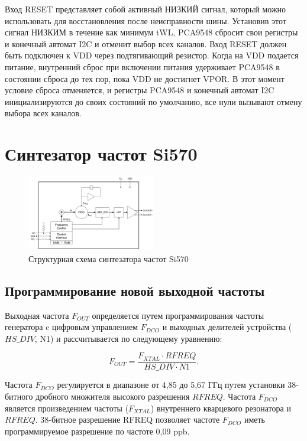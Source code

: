 \documentclass[a4paper,oneside ,14pt]{extreport}
\begin{document}
Вход RESET представляет собой активный НИЗКИЙ сигнал, который можно использовать для восстановления после неисправности шины. Установив этот сигнал НИЗКИМ в течение как минимум tWL, PCA9548 сбросит свои регистры и конечный автомат I2C и отменит выбор всех каналов. Вход RESET должен быть подключен к VDD через подтягивающий резистор.
Когда на VDD подается питание, внутренний сброс при включении питания удерживает PCA9548 в состоянии сброса до тех пор, пока VDD не достигнет VPOR. В этот момент условие сброса отменяется, и регистры PCA9548 и конечный автомат I2C инициализируются до своих состояний по умолчанию, все нули вызывают отмену выбора всех каналов.

\section{Синтезатор частот Si570}

\begin{figure}[h]
	\centering
	\includegraphics[width=0.5\textwidth]{image/Si570.png}
	\caption{Структурная схема синтезатора частот Si570}
	\label{Si570.PNG}
\end{figure}

\subsection{Программирование новой выходной частоты}

Выходная частота \(F_{OUT}\) определяется путем программирования частоты генератора c цифровым управлением \(F_{DCO}\) и выходных делителей устройства (\(HS\_DIV\), N1) и рассчитывается по следующему уравнению:

\begin{equation}	
	F_{OUT} = \frac{F_{XTAL} \cdot RFREQ}{HS\_DIV \cdot N1}.
\end{equation}

Частота \(F_{DCO}\) регулируется в диапазоне от 4,85 до 5,67 ГГц путем установки 38-битного дробного множителя высокого разрешения \(RFREQ\). Частота \(F_{DCO}\) является произведением частоты (\(F_{XTAL}\)) внутреннего кварцевого резонатора и \(RFREQ\). 38-битное разрешение RFREQ позволяет частоте \(F_{DCO}\) иметь программируемое разрешение по частоте 0,09 ppb.
\end{document}
